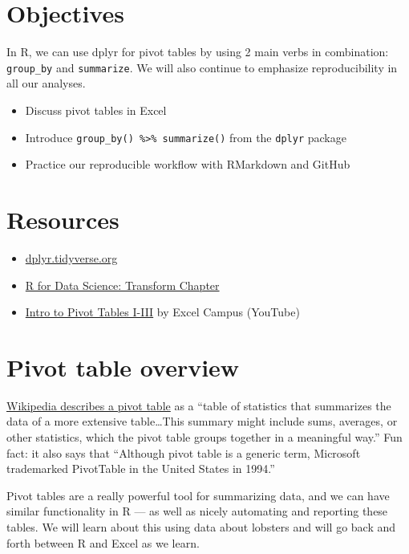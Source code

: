 \documentclass[]{book}
\providecommand{\tightlist}{%
  \setlength{\itemsep}{0pt}\setlength{\parskip}{0pt}}
\begin{document}
\hypertarget{objectives-4}{%
\section{Objectives}\label{objectives-4}}

In R, we can use dplyr for pivot tables by using 2 main verbs in combination: \texttt{group\_by} and \texttt{summarize}. We will also continue to emphasize reproducibility in all our analyses.

\begin{itemize}
\tightlist
\item
  Discuss pivot tables in Excel
\item
  Introduce \texttt{group\_by()\ \%\textgreater{}\%\ summarize()} from the \texttt{dplyr} package
\item
  Practice our reproducible workflow with RMarkdown and GitHub
\end{itemize}

\hypertarget{resources-5}{%
\section{Resources}\label{resources-5}}

\begin{itemize}
\tightlist
\item
  \href{https://dplyr.tidyverse.org/}{dplyr.tidyverse.org}
\item
  \href{https://r4ds.had.co.nz/transform.html}{R for Data Science: Transform Chapter}
\item
  \href{https://youtu.be/g530cnFfk8Y}{Intro to Pivot Tables I-III} by Excel Campus (YouTube)
\end{itemize}

\hypertarget{pivot-table-overview}{%
\section{Pivot table overview}\label{pivot-table-overview}}

\href{https://en.wikipedia.org/wiki/Pivot_table}{Wikipedia describes a pivot table} as a ``table of statistics that summarizes the data of a more extensive table\ldots{}This summary might include sums, averages, or other statistics, which the pivot table groups together in a meaningful way.'' Fun fact: it also says that ``Although pivot table is a generic term, Microsoft trademarked PivotTable in the United States in 1994.''

Pivot tables are a really powerful tool for summarizing data, and we can have similar functionality in R --- as well as nicely automating and reporting these tables. We will learn about this using data about lobsters and will go back and forth between R and Excel as we learn.
\end{document}
